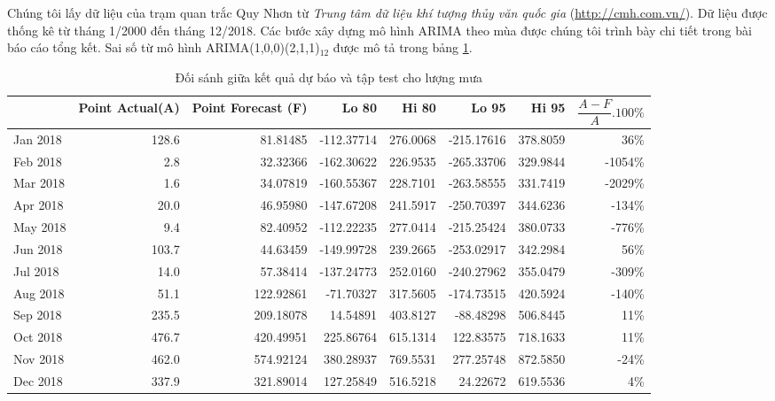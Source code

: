 \documentclass[12pt, a4paper,oneside]{book}
\theoremstyle{definition}
\begin{document}
Chúng tôi lấy dữ liệu của trạm quan trắc Quy Nhơn từ \textit{Trung tâm dữ liệu khí tượng thủy văn quốc gia} (\url{http://cmh.com.vn/}). Dữ liệu được thống kê từ tháng 1/2000 đến tháng 12/2018. Các bước xây dựng mô hình ARIMA theo mùa được chúng tôi trình bày chi tiết trong bài báo cáo tổng kết. Sai số từ mô hình ARIMA(1,0,0)(2,1,1)$_{12}$ được mô tả trong bảng \ref{test_fc}.
\begin{table}[!h]	
	\caption{Đối sánh giữa kết quả dự báo và tập test cho lượng mưa}
	\label{test_fc}
	\centering
	\fontsize{6}{7}\selectfont
	\begin{tabular}[t]{lrrrrrrr}
		\toprule
		&Point Actual(A) & Point Forecast (F)& Lo 80 & Hi 80 & Lo 95 & Hi 95& $\dfrac{A-F}{A}.100\%$\\
		\midrule
		\rowcolor{gray!6}  Jan 2018 & 128.6 & 81.81485 & -112.37714 & 276.0068 & -215.17616 & 378.8059 & 36\%\\
		Feb 2018 & 2.8 & 32.32366 & -162.30622 & 226.9535 & -265.33706 & 329.9844 & -1054\%\\
		\rowcolor{gray!6}  Mar 2018 & 1.6 & 34.07819 & -160.55367 & 228.7101 & -263.58555 & 331.7419 & -2029\%\\
		Apr 2018 & 20.0 & 46.95980 & -147.67208 & 241.5917 & -250.70397 & 344.6236 & -134\%\\
		\rowcolor{gray!6}  May 2018 & 9.4 & 82.40952 & -112.22235 & 277.0414 & -215.25424 & 380.0733 & -776\%\\
		\addlinespace
		Jun 2018 & 103.7 & 44.63459 & -149.99728 & 239.2665 & -253.02917 & 342.2984 & 56\%\\
		\rowcolor{gray!6}  Jul 2018 & 14.0 & 57.38414 & -137.24773 & 252.0160 & -240.27962 & 355.0479 & -309\%\\
		Aug 2018 & 51.1 & 122.92861 & -71.70327 & 317.5605 & -174.73515 & 420.5924 & -140\%\\
		\rowcolor{gray!6}  Sep 2018 & 235.5 & 209.18078 & 14.54891 & 403.8127 & -88.48298 & 506.8445 & 11\%\\
		Oct 2018 & 476.7 & 420.49951 & 225.86764 & 615.1314 & 122.83575 & 718.1633 & 11\%\\
		\addlinespace
		\rowcolor{gray!6}  Nov 2018 & 462.0 & 574.92124 & 380.28937 & 769.5531 & 277.25748 & 872.5850 & -24\%\\
		Dec 2018 & 337.9 & 321.89014 & 127.25849 & 516.5218 & 24.22672 & 619.5536 & 4\%\\
		\bottomrule
	\end{tabular}
\end{table}
\end{document}
